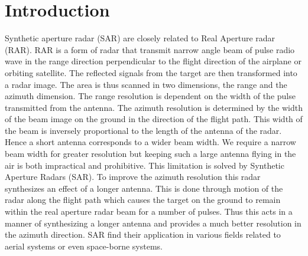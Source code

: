 \documentclass[twoside,10pt,a4paper]{article}
\numberwithin{equation}{section}					%
\numberwithin{figure}{section}						%
\begin{document}
\section{Introduction}\label{sec:section1}				%
Synthetic aperture radar (SAR) are closely related to Real Aperture radar (RAR). RAR is a form of radar that transmit narrow angle beam of pulse radio wave in the range direction perpendicular to the flight direction of the airplane or orbiting satellite. The reflected signals from the target are then transformed into a radar image. The area is thus scanned in two dimensions, the range and the azimuth dimension. The range resolution is dependent on the width of the pulse transmitted from the antenna. The azimuth resolution is determined by the width of the beam image on the ground in the direction of the flight path. This width of the beam is inversely proportional to the length of the antenna of the radar. Hence a short antenna corresponds to a wider beam width. We require a narrow beam width for greater resolution but keeping such a large antenna flying in the air is both impractical and prohibitive. This limitation is solved by Synthetic Aperture Radars (SAR). To improve the azimuth resolution this radar synthesizes an effect of a longer antenna. This is done through motion of the radar along the flight path which causes the target on the ground to remain within the real aperture radar beam for a number of pulses. Thus this acts in a manner of synthesizing a longer antenna and provides a much better resolution in the azimuth direction. SAR find their application in various fields related to aerial systems or even space-borne systems.
\end{document}
